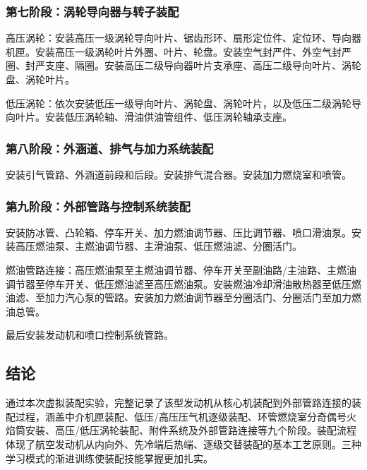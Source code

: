 \subsubsection{第七阶段：涡轮导向器与转子装配}

高压涡轮：安装高压一级涡轮导向叶片、锯齿形环、扇形定位件、定位环、导向器机匣。安装高压一级涡轮叶片外圈、叶片、轮盘。安装空气封严件、外空气封严圈、封严支座、隔圈。安装高压二级导向器叶片支承座、高压二级导向叶片、涡轮盘、涡轮叶片。

低压涡轮：依次安装低压一级导向叶片、涡轮盘、涡轮叶片，以及低压二级涡轮导向叶片。安装低压涡轮轴、滑油供油管组件、低压涡轮轴承支座。

\subsubsection{第八阶段：外涵道、排气与加力系统装配}

安装引气管路、外涵道前段和后段。安装排气混合器。安装加力燃烧室和喷管。

\subsubsection{第九阶段：外部管路与控制系统装配}

安装防冰管、凸轮箱、停车开关、加力燃油调节器、压比调节器、喷口滑油泵。安装高压燃油泵、主燃油调节器、主滑油泵、低压燃油滤、分圈活门。

燃油管路连接：高压燃油泵至主燃油调节器、停车开关至副油路/主油路、主燃油调节器至停车开关、低压燃油滤至高压燃油泵。安装燃油冷却滑油散热器至低压燃油滤、至加力汽心泵的管路。安装加力燃油调节器至分圈活门、分圈活门至加力燃油总管。

最后安装发动机和喷口控制系统管路。

\subsection{结论}

通过本次虚拟装配实验，完整记录了该型发动机从核心机装配到外部管路连接的装配过程，涵盖中介机匣装配、低压/高压压气机逐级装配、环管燃烧室分奇偶号火焰筒安装、高压/低压涡轮装配、附件系统及外部管路连接等九个阶段。装配流程体现了航空发动机从内向外、先冷端后热端、逐级交替装配的基本工艺原则。三种学习模式的渐进训练使装配技能掌握更加扎实。
